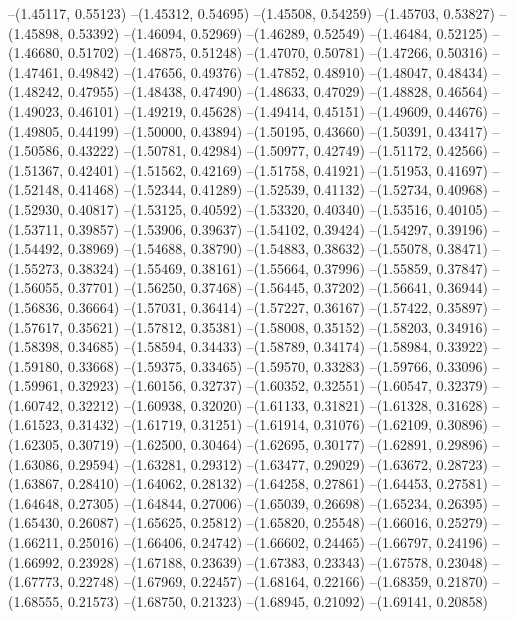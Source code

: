 --(1.45117, 0.55123)
--(1.45312, 0.54695)
--(1.45508, 0.54259)
--(1.45703, 0.53827)
--(1.45898, 0.53392)
--(1.46094, 0.52969)
--(1.46289, 0.52549)
--(1.46484, 0.52125)
--(1.46680, 0.51702)
--(1.46875, 0.51248)
--(1.47070, 0.50781)
--(1.47266, 0.50316)
--(1.47461, 0.49842)
--(1.47656, 0.49376)
--(1.47852, 0.48910)
--(1.48047, 0.48434)
--(1.48242, 0.47955)
--(1.48438, 0.47490)
--(1.48633, 0.47029)
--(1.48828, 0.46564)
--(1.49023, 0.46101)
--(1.49219, 0.45628)
--(1.49414, 0.45151)
--(1.49609, 0.44676)
--(1.49805, 0.44199)
--(1.50000, 0.43894)
--(1.50195, 0.43660)
--(1.50391, 0.43417)
--(1.50586, 0.43222)
--(1.50781, 0.42984)
--(1.50977, 0.42749)
--(1.51172, 0.42566)
--(1.51367, 0.42401)
--(1.51562, 0.42169)
--(1.51758, 0.41921)
--(1.51953, 0.41697)
--(1.52148, 0.41468)
--(1.52344, 0.41289)
--(1.52539, 0.41132)
--(1.52734, 0.40968)
--(1.52930, 0.40817)
--(1.53125, 0.40592)
--(1.53320, 0.40340)
--(1.53516, 0.40105)
--(1.53711, 0.39857)
--(1.53906, 0.39637)
--(1.54102, 0.39424)
--(1.54297, 0.39196)
--(1.54492, 0.38969)
--(1.54688, 0.38790)
--(1.54883, 0.38632)
--(1.55078, 0.38471)
--(1.55273, 0.38324)
--(1.55469, 0.38161)
--(1.55664, 0.37996)
--(1.55859, 0.37847)
--(1.56055, 0.37701)
--(1.56250, 0.37468)
--(1.56445, 0.37202)
--(1.56641, 0.36944)
--(1.56836, 0.36664)
--(1.57031, 0.36414)
--(1.57227, 0.36167)
--(1.57422, 0.35897)
--(1.57617, 0.35621)
--(1.57812, 0.35381)
--(1.58008, 0.35152)
--(1.58203, 0.34916)
--(1.58398, 0.34685)
--(1.58594, 0.34433)
--(1.58789, 0.34174)
--(1.58984, 0.33922)
--(1.59180, 0.33668)
--(1.59375, 0.33465)
--(1.59570, 0.33283)
--(1.59766, 0.33096)
--(1.59961, 0.32923)
--(1.60156, 0.32737)
--(1.60352, 0.32551)
--(1.60547, 0.32379)
--(1.60742, 0.32212)
--(1.60938, 0.32020)
--(1.61133, 0.31821)
--(1.61328, 0.31628)
--(1.61523, 0.31432)
--(1.61719, 0.31251)
--(1.61914, 0.31076)
--(1.62109, 0.30896)
--(1.62305, 0.30719)
--(1.62500, 0.30464)
--(1.62695, 0.30177)
--(1.62891, 0.29896)
--(1.63086, 0.29594)
--(1.63281, 0.29312)
--(1.63477, 0.29029)
--(1.63672, 0.28723)
--(1.63867, 0.28410)
--(1.64062, 0.28132)
--(1.64258, 0.27861)
--(1.64453, 0.27581)
--(1.64648, 0.27305)
--(1.64844, 0.27006)
--(1.65039, 0.26698)
--(1.65234, 0.26395)
--(1.65430, 0.26087)
--(1.65625, 0.25812)
--(1.65820, 0.25548)
--(1.66016, 0.25279)
--(1.66211, 0.25016)
--(1.66406, 0.24742)
--(1.66602, 0.24465)
--(1.66797, 0.24196)
--(1.66992, 0.23928)
--(1.67188, 0.23639)
--(1.67383, 0.23343)
--(1.67578, 0.23048)
--(1.67773, 0.22748)
--(1.67969, 0.22457)
--(1.68164, 0.22166)
--(1.68359, 0.21870)
--(1.68555, 0.21573)
--(1.68750, 0.21323)
--(1.68945, 0.21092)
--(1.69141, 0.20858)
